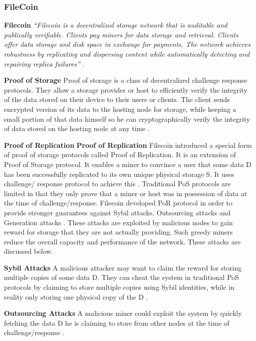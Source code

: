 \subsubsection{FileCoin}
\textbf{Filecoin}
\textit{ “Filecoin is a decentralized storage network that is auditable and publically verifiable. Clients pay miners for data storage and retrieval. Clients offer data storage and disk space in exchange for payments. The network achieves robustness by replicating and dispersing content while automatically detecting and repairing replica failures”} \cite{paper:007}.

\textbf{Proof of Storage}
Proof of storage is a class of decentralized challenge response protocols. They allow a storage provider or host to efficiently verify the integrity of the data stored on their device to their users or clients. The client sends encrypted version of its data to the hosting node for storage, while keeping a small portion of that data himself so he can cryptographically verify the integrity of data stored on the hosting node at any time \cite{paper:007}.

\textbf{Proof of Replication}
\textbf{Proof of Replication}
Filecoin introduced a special form of proof of storage protocols called Proof of Replication. It is an extension of Proof of Storage protocol. It enables a miner to convince a user that some data D has been successfully replicated to its own unique physical storage S. It uses challenge/ response protocol to achieve this \cite{paper:007}. Traditional PoS protocols are limited in that they only prove that a miner or host was in possession of data at the time of challenge/response. Filecoin developed PoR protocol in order to provide stronger guarantees against Sybil attacks, Outsourcing attacks and Generation attacks \cite{paper:007}. These attacks are exploited by malicious nodes to gain reward for storage that they are not actually providing. Such greedy miners reduce the overall capacity and performance of the network. These attacks are discussed below.

\textbf{Sybil Attacks}
A malicious attacker may want to claim the reward for storing multiple copies of some data D. They can cheat the system in traditional PoS protocols by claiming to store multiple copies using Sybil identities, while in reality only storing one physical copy of the D \cite{paper:007}.

\textbf{Outsourcing Attacks}
A malicious miner could exploit the system by quickly fetching the data D he is claiming to store from other nodes at the time of challenge/response \cite{paper:007}.

